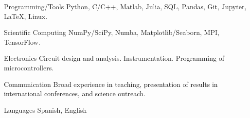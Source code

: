 

\begin{cvskills}

  \cvskill
    {Programming/Tools} %
    {Python, C/C++, Matlab, Julia, SQL, Pandas, Git, Jupyter, LaTeX, Linux.} %

  \cvskill
    {Scientific Computing} %
    {NumPy/SciPy, Numba, Matplotlib/Seaborn, MPI, TensorFlow.} %

  \cvskill
    {Electronics} %
    {Circuit design and analysis. Instrumentation. Programming of microcontrollers.} %

  \cvskill
    {Communication} %
    {Broad experience in teaching, presentation of results in international conferences, and science outreach.} %

  \cvskill
    {Languages} %
    {Spanish, English} %

\end{cvskills}
